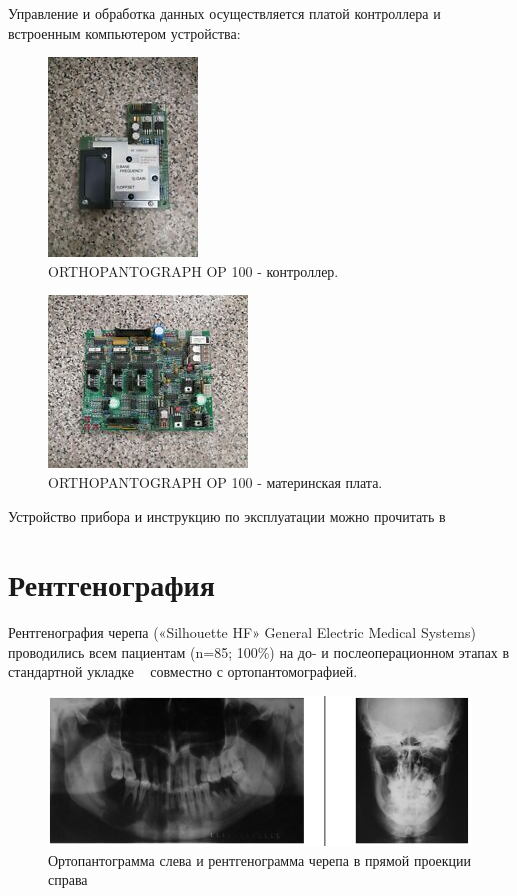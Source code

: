 \documentclass[11pt]{article}
\begin{document}
	Управление и обработка данных осуществляется платой контроллера и встроенным компьютером устройства:
	
	\begin{figure}[H]
		\centering
		\includegraphics[]{op100_1}
		\caption{ORTHOPANTOGRAPH OP 100 - контроллер. }
		\label{fig:opt100_1}
	\end{figure}

	\begin{figure}[H]
	\centering
	\includegraphics[]{op100_2}
	\caption{ORTHOPANTOGRAPH OP 100 - материнская плата. }
	\label{fig:opt100_2}
	\end{figure}

	Устройство прибора и инструкцию по эксплуатации можно прочитать в  ~\cite{op100}
	\section{Рентгенография}
	Рентгенография  черепа («Silhouette HF» General Electric Medical Systems) проводились всем пациентам (n=85; 100\%) на до- и послеоперационном этапах в стандартной укладке ~\cite{rejr} совместно с ортопантомографией.
	
	\begin{figure}[H]
		\centering
		\includegraphics[width=\textwidth]{r1}
		\caption{Ортопантограмма слева и рентгенограмма черепа в прямой проекции справа }
		\label{fig:r1}
	\end{figure}
\end{document}
